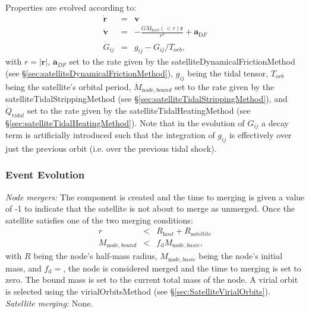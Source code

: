 Properties are evolved according to:
\begin{eqnarray}
\dot{\mathbf{r}}&=&\mathbf{v}\\
\dot{\mathbf{v}}&=&-\frac{G M_{\mathrm host}(<r)\mathbf{r}}{r^3}+{\mathbf a}_{\mathrm DF}\\
\dot{G}_{ij}&=&g_{ij}-G_{ij}/T_{\mathrm orb},
\end{eqnarray}
with $r=|\mathbf{r}|$, ${\mathbf a}_{DF}$ set to the rate given by the {\normalfont \ttfamily satelliteDynamicalFrictionMethod} (see \S\ref{sec:satelliteDynamicalFrictionMethod}), $g_{ij}$ being the tidal tensor, $T_{\mathrm orb}$ being the satellite's orbital period, $\dot{M}_{\mathrm node,bound}$ set to the rate given by the {\normalfont \ttfamily satelliteTidalStrippingMethod} (see \S\ref{sec:satelliteTidalStrippingMethod}), and $\dot{Q}_{\mathrm tidal}$ set to the rate given by the {\normalfont \ttfamily satelliteTidalHeatingMethod} (see \S\ref{sec:satelliteTidalHeatingMethod}). Note that in the evolution of $G_{ij}$ a decay term is artificially introduced such that the integration of $g_{ij}$ is effectively over just the previous orbit (i.e. over the previous tidal shock).

\subsubsection{Event Evolution}

\noindent\emph{Node mergers:} The \gls{component} is created and the time to merging is given a value of -1 to indicate that the satellite is not about to merge as unmerged.  Once the satellite satisfies one of the two merging conditions:
\begin{eqnarray}
r&<&R_{\mathrm host}+R_{\mathrm satellite}\\
M_{\mathrm node,bound}&<&f_{\mathrm d} M_{\mathrm node,basic},
\end{eqnarray}
with $R$ being the node's half-mass radius, $M_{\mathrm node,basic}$ being the node's initial mass, and $f_{\mathrm d}=${\normalfont \ttfamily [satelliteOrbitingDestructionMassFraction]}, the node is considered merged and the time to merging is set to zero. The bound mass is set to the current total mass of the node. A virial orbit is selected using the {\normalfont \ttfamily virialOrbitsMethod} (see \S\ref{sec:SatelliteVirialOrbits}). \\

\noindent\emph{Satellite merging:} None.\\

